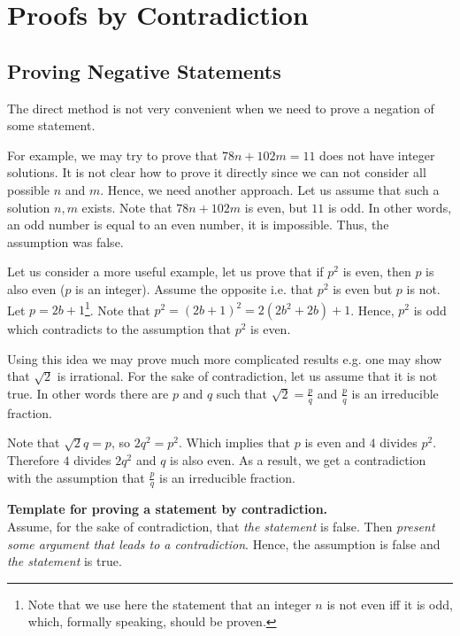 \chapter{Proofs by Contradiction}
\section{Proving Negative Statements}
The direct method is not very convenient when we need to prove a negation of
some statement.

For example, we may try to prove that $78 n + 102 m = 11$ does not have integer
solutions. It is not clear how to prove it directly since we can not consider
all possible $n$ and $m$. Hence, we need another approach. Let us assume that
such a solution $n, m$ exists. Note that $78 n + 102 m$ is even, but $11$ is
odd. In other words, an odd number is equal to an even number, it is impossible.
Thus, the assumption was false.

Let us consider a more useful example, let us prove that if $p^2$ is even, then
$p$ is also even ($p$ is an integer). Assume the opposite i.e. that $p^2$ is
even but $p$ is not. Let $p = 2b + 1$\footnote{Note that we use here the
statement that an integer $n$ is not even iff it is odd, which, formally
speaking, should be proven.}. Note that $p^2 = (2b + 1)^2 = 2(2b^2 + 2b) + 1$.
Hence, $p^2$ is odd which contradicts to the assumption that $p^2$ is even.

Using this idea we may prove much more complicated results e.g. one may show
that $\sqrt{2}$ is irrational. For the sake of contradiction, let us assume
that it is not true. In other words there are $p$ and $q$ such that
$\sqrt{2} = \frac{p}{q}$ and $\frac{p}{q}$ is an irreducible fraction.

Note that $\sqrt{2} q = p$, so $2q^2 = p^2$. Which implies that $p$ is even
and $4$ divides $p^2$. Therefore $4$ divides $2q^2$ and $q$ is also even. As
a result, we get a contradiction with the assumption that $\frac{p}{q}$ is an
irreducible fraction.

\begin{template}
  \textbf{Template for proving a statement by contradiction.} \\

  Assume, for the sake of contradiction, that \emph{the statement} is false.
  Then \emph{present some argument that leads to a contradiction}. Hence, the
  assumption is false and \emph{the statement} is true.
\end{template}

